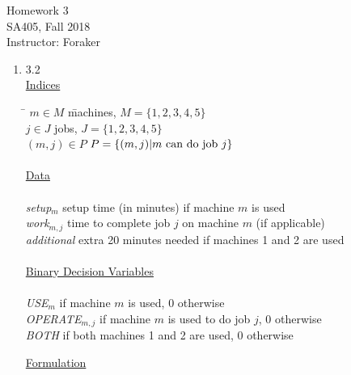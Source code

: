 \documentclass[10pt]{article}
\begin{document}
\begin{center}
  {\sc Homework 3}\\
  {\sc SA405, Fall 2018} \\
  {\sc Instructor: Foraker}
\end{center}

\medskip

\begin{enumerate}

\item 3.2 \\

\noindent\underline{Indices}
\begin{tabbing}
\hspace{.5cm} \= $m\in M$ \hspace{2.5cm} \= machines, $M=\{1,2,3,4,5\}$ \\
\> $j\in J$ \> jobs, $J=\{1,2,3,4,5\}$\\
\> $(m,j)\in P$ \> $P=\{(m,j)|m~{\rm can~do~job}~j\}$ \\

\\
\noindent\underline{Data}\\%
\\
\> {\it setup}$_{m}$ \> setup time (in minutes) if machine $m$ is used\\
\> {\it work}$_{m,j}$ \> time to complete job $j$ on machine $m$ (if applicable) \\
\> {\it additional} \> extra 20 minutes needed if machines 1 and 2 are used \\
\\

\noindent\underline{Binary Decision Variables}\\%
\\
\> {\it USE}$_m$  if machine $m$ is used, 0 otherwise  \\
\> {\it OPERATE}$_{m,j}$  if machine $m$ is used to do job $j$, 0 otherwise \\
\> {\it BOTH}  if both machines 1 and 2 are used, 0 otherwise\\
\end{tabbing}


\noindent\underline{Formulation}


\end{enumerate}
\end{document}
